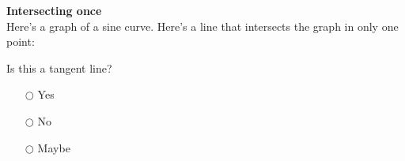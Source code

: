 \documentclass[pdftex, brazil, 12pt, twoside]{article}
\begin{document}
\begin{exercise}
  \textbf{Intersecting once}\\%
  Here's a graph of a sine curve. Here's a line that intersects the graph in only
  one point:
  \begin{figure}[H]
    \begin{center}
    \end{center}
  \end{figure}
  Is this a tangent line?
  \begin{itemize}[noitemsep]
  \item[$\bigcirc$] Yes
  \item[$\bigcirc$] No
  \item[$\bigcirc$] Maybe
  \end{itemize}
\end{exercise}
\end{document}
